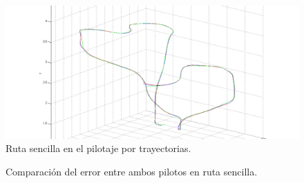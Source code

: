 \begin{figure}[H]
	\begin{center}
		\includegraphics[width=1.0\textwidth]{imag/IMG40.png}
				\caption{Ruta sencilla en el pilotaje por trayectorias.}
		\label{fig:Ruta sencilla en trayectoria.}	
	\end{center}
\end{figure}

\begin{figure}[H]
 \centering
 \caption{Comparación del error entre ambos pilotos en ruta sencilla.}
 \label{f:Comparativa del error sencilla.}
\end{figure} 

